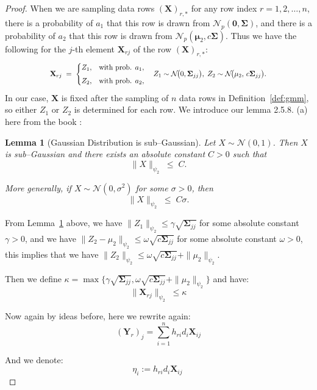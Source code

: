 \documentclass[11pt]{article}
\numberwithin{equation}{section}
\theoremstyle{plain}
\newtheorem{lemma}[theorem]{Lemma}
\theoremstyle{definition}
\theoremstyle{remark}
\begin{document}
\begin{proof}
When we are sampling data rows $(\mathbf{X})_{r,*}$ for any row index $r=1,2,\ldots,n$,
there is a probability of $a_1$ that this row is drawn from $\mathcal N_{p}(\boldsymbol0,\mathbf{\Sigma})$, 
and there is a probability of $a_2$ that this row is drawn from $\mathcal N_{p}(\boldsymbol\mu_{2},c\mathbf{\Sigma})$.
Thus we have the following for the $j$-th element $\mathbf{X}_{rj}$ of the row $(\mathbf{X})_{r,*}$:
\[
\scalebox{0.85}{$
   \mathbf{X}_{rj} \;=\;
   \begin{cases}
      Z_1, & \text{with prob. } a_1,\\[4pt]
      Z_2, & \text{with prob. } a_2,
   \end{cases}
   \quad
   Z_1 \sim \mathcal N\!\bigl(0,\mathbf{\Sigma}_{jj}\bigr),\;
   Z_2 \sim \mathcal N\!\bigl(\mu_2,\,c\mathbf{\Sigma}_{jj}\bigr).
$}
\]
In our case, $\mathbf{X}$ is fixed after the sampling of $n$ data rows in Definition~\ref{def:gmm},
so either $Z_{1}$ or $Z_{2}$ is determined for each row.
We introduce our lemma 2.5.8. (a) here from the book \cite{vershynin2018high}:
\begin{lemma}[Gaussian Distribution is sub--Gaussian]\label{lem:gaussian-subg}
  \leavevmode
        Let \(X\sim\mathcal N(0,1)\).  
        Then \(X\) is sub--Gaussian and there exists an absolute constant \(C>0\) such that  
        \[
          \|X\|_{\psi_{2}}\;\le\;C.
        \]
  
        More generally, if \(X\sim\mathcal N(0,\sigma^{2})\) for some \(\sigma>0\), then  
        \[
          \|X\|_{\psi_{2}}\;\le\;C\sigma.
        \]
  \end{lemma}
\vspace{0.39cm}
From Lemma~\ref{lem:gaussian-subg} above, we have $\|Z_1\|_{\psi_{2}}\leq\gamma\sqrt{\mathbf{\Sigma}_{jj}}$ 
for some absolute constant $\gamma > 0$, and we have $\|Z_2-\mu_2\|_{\psi_{2}}\leq\omega\sqrt{c\mathbf{\Sigma}_{jj}}$
for some absolute constant $\omega > 0$, this implies that we have $\|Z_2\|_{\psi_{2}}\leq\omega\sqrt{c\mathbf{\Sigma}_{jj}}+\|\mu_2\|_{\psi_{2}}$.

Then we define $\kappa = \max\bigl\{\gamma\sqrt{\mathbf{\Sigma}_{jj}},\omega\sqrt{c\mathbf{\Sigma}_{jj}}+\|\mu_2\|_{\psi_{2}}\bigr\}$ and have:
\[
\|\mathbf{X}_{rj}\|_{\psi_{2}}\;\le\kappa
\]

Now again by ideas before, here we rewrite again:
\[(\mathbf{Y}_{r})_{j} = \sum_{i=1}^{n} h_{ri} d_{i} \mathbf{X}_{ij}\]

And we denote:
\[
  \eta_{i} := h_{ri} d_{i} \mathbf{X}_{ij}\
\]


\end{proof}
\end{document}
